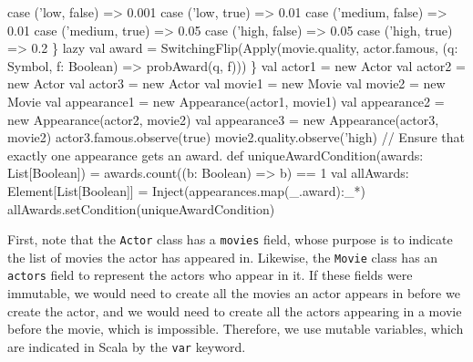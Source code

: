 \begin{flushleft}
{\newline \tab \tab case ('low, false) => 0.001
\newline \tab \tab case ('low, true) => 0.01
\newline \tab \tab case ('medium, false) => 0.01
\newline \tab \tab case ('medium, true) => 0.05
\newline \tab \tab case ('high, false) => 0.05
\newline \tab \tab case ('high, true) => 0.2
\newline \tab \tab \}
\newline \tab lazy val award = SwitchingFlip(Apply(movie.quality, actor.famous, (q: Symbol, f: Boolean) => probAward(q, f)))
\newline \}
\newline 
\newline val actor1 = new Actor 
\newline val actor2 = new Actor 
\newline val actor3 = new Actor 
\newline val movie1 = new Movie 
\newline val movie2 = new Movie
\newline val appearance1 = new Appearance(actor1, movie1)
\newline val appearance2 = new Appearance(actor2, movie2) 
\newline val appearance3 = new Appearance(actor3, movie2) 
\newline actor3.famous.observe(true) 
\newline movie2.quality.observe('high)
\newline 
\newline // Ensure that exactly one appearance gets an award. 
\newline def uniqueAwardCondition(awards: List[Boolean]) =
\newline \tab awards.count((b: Boolean) => b) == 1 
\newline val allAwards: Element[List[Boolean]] =
\newline \tab Inject(appearances.map(\_.award):\_*)
\newline allAwards.setCondition(uniqueAwardCondition)
}
\end{flushleft}

First, note that the \texttt{Actor} class has a \texttt{movies} field, whose purpose is to indicate the list of movies the actor has appeared in. Likewise, the \texttt{Movie} class has an \texttt{actors} field to represent the actors who appear in it. If these fields were immutable, we would need to create all the movies an actor appears in before we create the actor, and we would need to create all the actors appearing in a movie before the movie, which is impossible. Therefore, we use mutable variables, which are indicated in Scala by the \texttt{var} keyword.

